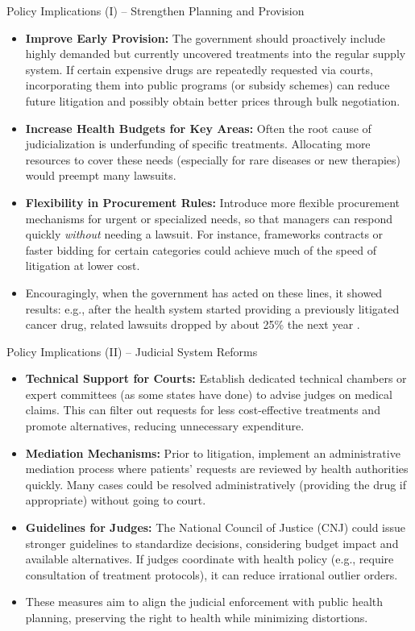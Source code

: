 \documentclass{beamer}
\begin{document}
\begin{frame}{Policy Implications (I) – Strengthen Planning and Provision}
\begin{itemize}
  \item \textbf{Improve Early Provision:} The government should proactively include highly demanded but currently uncovered treatments into the regular supply system. If certain expensive drugs are repeatedly requested via courts, incorporating them into public programs (or subsidy schemes) can reduce future litigation and possibly obtain better prices through bulk negotiation.
  \item \textbf{Increase Health Budgets for Key Areas:} Often the root cause of judicialization is underfunding of specific treatments. Allocating more resources to cover these needs (especially for rare diseases or new therapies) would preempt many lawsuits.
  \item \textbf{Flexibility in Procurement Rules:} Introduce more flexible procurement mechanisms for urgent or specialized needs, so that managers can respond quickly \emph{without} needing a lawsuit. For instance, frameworks contracts or faster bidding for certain categories could achieve much of the speed of litigation at lower cost.
  \item Encouragingly, when the government has acted on these lines, it showed results: e.g., after the health system started providing a previously litigated cancer drug, related lawsuits dropped by about 25\% the next year \citep{Borges2018}.
\end{itemize}
\end{frame}

\begin{frame}{Policy Implications (II) – Judicial System Reforms}
\begin{itemize}
  \item \textbf{Technical Support for Courts:} Establish dedicated technical chambers or expert committees (as some states have done) to advise judges on medical claims. This can filter out requests for less cost-effective treatments and promote alternatives, reducing unnecessary expenditure.
  \item \textbf{Mediation Mechanisms:} Prior to litigation, implement an administrative mediation process where patients’ requests are reviewed by health authorities quickly. Many cases could be resolved administratively (providing the drug if appropriate) without going to court.
  \item \textbf{Guidelines for Judges:} The National Council of Justice (CNJ) could issue stronger guidelines to standardize decisions, considering budget impact and available alternatives. If judges coordinate with health policy (e.g., require consultation of treatment protocols), it can reduce irrational outlier orders.
  \item These measures aim to align the judicial enforcement with public health planning, preserving the right to health while minimizing distortions.
\end{itemize}
\end{frame}
\end{document}
